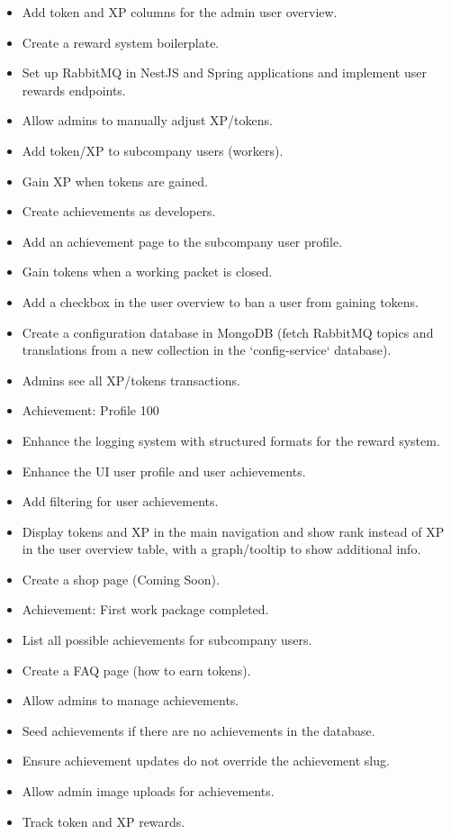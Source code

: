 \begin{itemize}
    \item Add token and XP columns for the admin user overview.
    \item Create a reward system boilerplate.
    \item Set up RabbitMQ in NestJS and Spring applications and implement user rewards endpoints.
    \item Allow admins to manually adjust XP/tokens.
    \item Add token/XP to subcompany users (workers).
    \item Gain XP when tokens are gained.
    \item Create achievements as developers.
    \item Add an achievement page to the subcompany user profile.
    \item Gain tokens when a working packet is closed.
    \item Add a checkbox in the user overview to ban a user from gaining tokens.
    \item Create a configuration database in MongoDB (fetch RabbitMQ topics and translations from a new collection in the `config-service` database).
    \item Admins see all XP/tokens transactions.
    \item Achievement: Profile 100%
    \item Enhance the logging system with structured formats for the reward system.
    \item Enhance the UI user profile and user achievements.
    \item Add filtering for user achievements.
    \item Display tokens and XP in the main navigation and show rank instead of XP in the user overview table, with a graph/tooltip to show additional info.
    \item Create a shop page (Coming Soon).
    \item Achievement: First work package completed.
    \item List all possible achievements for subcompany users.
    \item Create a FAQ page (how to earn tokens).
    \item Allow admins to manage achievements.
    \item Seed achievements if there are no achievements in the database.
    \item Ensure achievement updates do not override the achievement slug.
    \item Allow admin image uploads for achievements.
    \item Track token and XP rewards.
\end{itemize}

